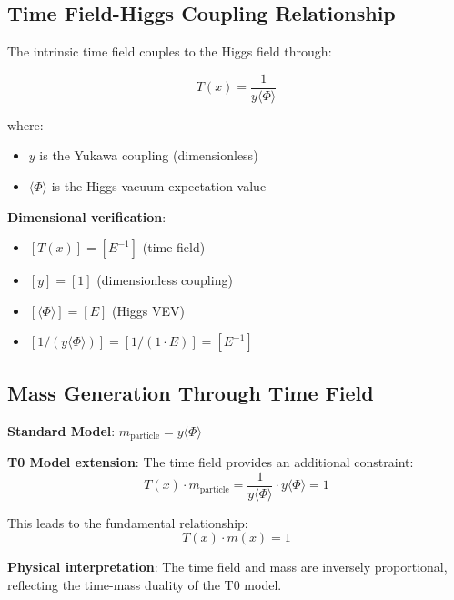 \documentclass[12pt,a4paper]{article}
\begin{document}
	\subsection{Time Field-Higgs Coupling Relationship}
	\label{subsec:time_higgs_coupling}
	
	The intrinsic time field couples to the Higgs field through:
	
	\begin{equation}
		\boxed{T(x) = \frac{1}{y\langle\Phi\rangle}}
	\end{equation}
	
	where:
	\begin{itemize}
		\item $y$ is the Yukawa coupling (dimensionless)
		\item $\langle\Phi\rangle$ is the Higgs vacuum expectation value
	\end{itemize}
	
	\textbf{Dimensional verification}:
	\begin{itemize}
		\item $[T(x)] = [E^{-1}]$ (time field)
		\item $[y] = [1]$ (dimensionless coupling)
		\item $[\langle\Phi\rangle] = [E]$ (Higgs VEV)
		\item $[1/(y\langle\Phi\rangle)] = [1/(1 \cdot E)] = [E^{-1}]$ \checkmark
	\end{itemize}
	
	\subsection{Mass Generation Through Time Field}
	\label{subsec:mass_generation}
	
	\textbf{Standard Model}: $m_{\text{particle}} = y \langle\Phi\rangle$
	
	\textbf{T0 Model extension}: The time field provides an additional constraint:
	\begin{equation}
		T(x) \cdot m_{\text{particle}} = \frac{1}{y\langle\Phi\rangle} \cdot y\langle\Phi\rangle = 1
	\end{equation}
	
	This leads to the fundamental relationship:
	\begin{equation}
		\boxed{T(x) \cdot m(x) = 1}
	\end{equation}
	
	\textbf{Physical interpretation}: The time field and mass are inversely proportional, reflecting the time-mass duality of the T0 model.
	
\end{document}
